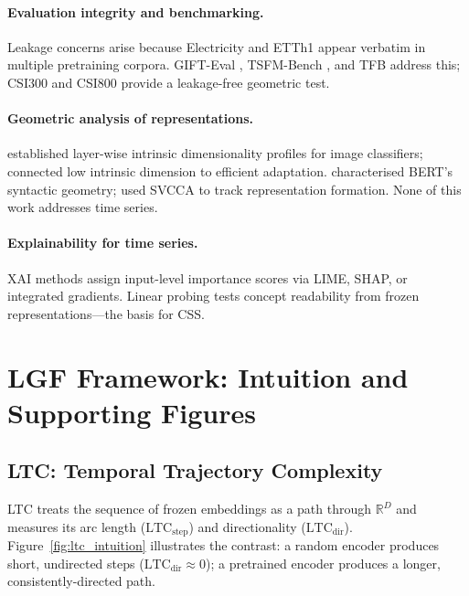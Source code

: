 \documentclass[10pt]{article}
\theoremstyle{definition}
\theoremstyle{remark}
\newcommand{\R}{\mathbb{R}}
\newcommand{\ltcstep}{\ensuremath{\mathrm{LTC}_{\mathrm{step}}}}
\newcommand{\ltcdir}{\ensuremath{\mathrm{LTC}_{\mathrm{dir}}}}
\begin{document}
\paragraph{Evaluation integrity and benchmarking.}
Leakage concerns \citep{meyer2025tsfmreview} arise because Electricity and
ETTh1 appear verbatim in multiple pretraining corpora.
GIFT-Eval \citep{aksu2024gifteval}, TSFM-Bench \citep{li2025tsfmbench}, and
TFB \citep{qiu2024tfb} address this; CSI300 and CSI800 provide a
leakage-free geometric test.

\paragraph{Geometric analysis of representations.}
\citet{ansuini2019intrinsic} established layer-wise intrinsic dimensionality
profiles for image classifiers; \citet{aghajanyan2021intrinsic} connected low
intrinsic dimension to efficient adaptation.
\citet{reif2019visualizing} characterised BERT's syntactic geometry;
\citet{raghu2017svcca} used SVCCA to track representation formation.
None of this work addresses time series.

\paragraph{Explainability for time series.}
XAI methods \citep{ismail2020benchmarking,theissler2022explainable} assign
input-level importance scores via LIME, SHAP, or integrated gradients.
Linear probing \citep{alain2017probing} tests concept readability from frozen
representations---the basis for CSS.

\section{LGF Framework: Intuition and Supporting Figures}
\label{app:framework_figs}

\subsection{LTC: Temporal Trajectory Complexity}
\label{app:ltc_fig}

LTC treats the sequence of frozen embeddings as a path through $\R^D$ and
measures its arc length ($\ltcstep$) and directionality ($\ltcdir$).
Figure~\ref{fig:ltc_intuition} illustrates the contrast: a random encoder
produces short, undirected steps ($\ltcdir{\approx}0$); a pretrained encoder
produces a longer, consistently-directed path.
\end{document}
